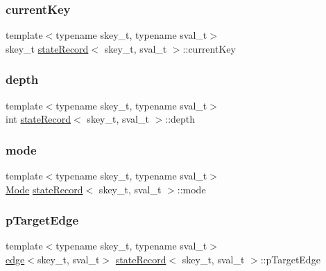 \subsubsection{\texorpdfstring{current\+Key}{currentKey}}
{\footnotesize\ttfamily template$<$typename skey\+\_\+t, typename sval\+\_\+t$>$ \\
skey\+\_\+t \hyperlink{structstateRecord}{state\+Record}$<$ skey\+\_\+t, sval\+\_\+t $>$\+::current\+Key}

\mbox{\label{structstateRecord_ac725427eab6460435554ac5a2f9d880d}} 
\subsubsection{\texorpdfstring{depth}{depth}}
{\footnotesize\ttfamily template$<$typename skey\+\_\+t, typename sval\+\_\+t$>$ \\
int \hyperlink{structstateRecord}{state\+Record}$<$ skey\+\_\+t, sval\+\_\+t $>$\+::depth}

\mbox{\label{structstateRecord_a1903fb379d70b6a7743cb5d329c17e44}} 
\subsubsection{\texorpdfstring{mode}{mode}}
{\footnotesize\ttfamily template$<$typename skey\+\_\+t, typename sval\+\_\+t$>$ \\
\hyperlink{intlf__impl_8h_a46c8a310cf4c094f8c80e1cb8dc1f911}{Mode} \hyperlink{structstateRecord}{state\+Record}$<$ skey\+\_\+t, sval\+\_\+t $>$\+::mode}

\mbox{\label{structstateRecord_ae2b05b20fc0184e8cf84005f1da73a6c}} 
\subsubsection{\texorpdfstring{p\+Target\+Edge}{pTargetEdge}}
{\footnotesize\ttfamily template$<$typename skey\+\_\+t, typename sval\+\_\+t$>$ \\
\hyperlink{structedge}{edge}$<$skey\+\_\+t, sval\+\_\+t$>$ \hyperlink{structstateRecord}{state\+Record}$<$ skey\+\_\+t, sval\+\_\+t $>$\+::p\+Target\+Edge}

